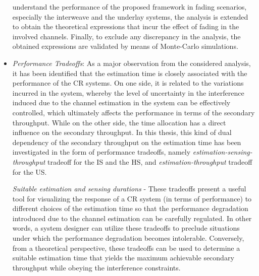 \begin{itemize}
understand the performance of the proposed framework in fading scenarios, especially the interweave and the underlay systems, the analysis is extended to obtain the theoretical expressions that incur the effect of fading in the involved channels. Finally, to exclude any discrepancy in the analysis, the obtained expressions are validated by means of Monte-Carlo simulations. 
\item \textit{Performance Tradeoffs}: 
As a major observation from the considered analysis, it has been identified that the estimation time is closely associated with the performance of the CR systems. On one side, it is related to the variations incurred in the system, whereby the level of uncertainty in the interference induced due to the channel estimation in the system can be effectively controlled, which ultimately affects the performance in terms of the secondary throughput. While on the other side, the time allocation has a direct influence on the secondary throughput. In this thesis, this kind of dual dependency of the secondary throughput on the estimation time has been investigated in the form of performance tradeoffs, namely \textit{estimation-sensing-throughput} tradeoff for the IS and the HS, and \textit{estimation-throughput} tradeoff for the US. \begin{mdframed}[style=MyFrame] \textit{Suitable estimation and sensing durations} - These tradeoffs present a useful tool for visualizing the response of a CR system (in terms of performance) to different choices of the estimation time so that the performance degradation introduced due to the channel estimation can be carefully regulated. In other words, a system designer can utilize these tradeoffs to preclude situations under which the performance degradation becomes intolerable. Conversely, from a theoretical perspective, these tradeoffs can be used to determine a suitable estimation time that yields the maximum achievable secondary throughput while obeying the interference constraints. \end{mdframed}
 

\end{itemize}
